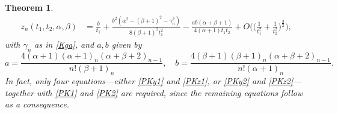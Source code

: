 \documentclass[10pt, reqno]{amsart}
\numberwithin{equation}{section}
\newtheorem{theorem}{Theorem}[section]
\numberwithin{equation}{section}
\begin{document}
\begin{theorem}
\begin{align}
z_n(t_1,t_2,\alpha,\beta)&=\frac{b}{t_1}+\frac{b^2(\alpha^2-(\beta+1)^2-\gamma_n^2)}{8(\beta+1)^2t_1^2}-\frac{ab(\alpha+\beta+1)}{4(\alpha+1)t_1t_2}+O\Big(\Big(\frac{1}{t_1^2} +\frac{1}{t_2^2}\Big)^\frac{3}{2}\Big),\label{aKz2}
\end{align}
with  $\gamma_n$ as in \eqref{Kga}, and $a,b$ given by
\begin{equation}
a=\frac{4(\alpha+1)(\alpha+1)_n(\alpha+\beta+2)_{n-1}}{n!(\beta+1)_n}, \quad b=\frac{4(\beta+1)(\beta+1)_n(\alpha+\beta+2)_{n-1}}{n!(\alpha+1)_n}.\label{ab}
\end{equation}
In fact, only four equations\;---\;either \eqref{PKy1} and \eqref{PKz1}, or \eqref{PKy2} and \eqref{PKz2}\;---\;together with \eqref{PK1} and \eqref{PK2} are required, since the remaining equations follow as a consequence.
\end{theorem}
\end{document}
